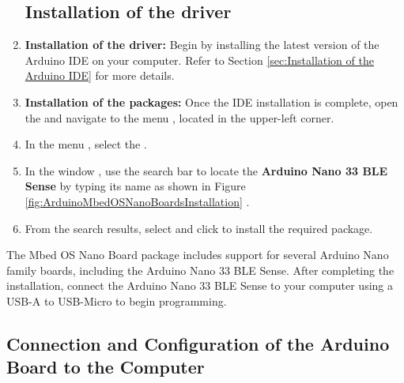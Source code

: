 \begin{enumerate}
	\subsection{Installation of the driver}
	\item \textbf{Installation of the driver:} Begin by installing the latest version of the Arduino IDE on your computer. Refer to Section \ref{sec:Installation of the Arduino IDE} for more details.
	\item \textbf{Installation of the packages:} Once the IDE installation is complete, open the  and navigate to the menu  , located in the upper-left corner.
	\item In the menu , select the .
	\item In the window , use the search bar to locate the \textbf{Arduino Nano 33 BLE Sense} by typing its name as shown in Figure \ref{fig:ArduinoMbedOSNanoBoardsInstallation}		.
	\item From the search results, select  and click  to install the required package.
\end{enumerate}

The Mbed OS Nano Board package includes support for several Arduino Nano family boards, including the Arduino Nano 33 BLE Sense. After completing the installation, connect the Arduino Nano 33 BLE Sense to your computer using a USB-A to USB-Micro to begin programming.

\begin{center}
				\label{fig:ArduinoMbedOSNanoBoardsInstallation}
\end{center}	




\subsection{Connection and Configuration of the Arduino Board to the Computer}

